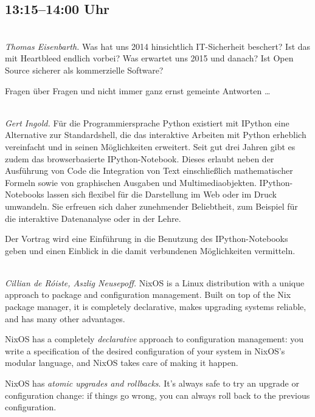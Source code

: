 \documentclass[10pt,a4paper,ngerman]{scrartcl}
\let\origdescription\description
\renewenvironment{description}{
  \setlength{\leftmargini}{0em}
  \origdescription
  \setlength{\itemindent}{0em}
  \setlength{\itemsep}{1.2em}
  \setlength{\labelsep}{\textwidth}
}
{\endlist}
\newcommand{\vorschub}{\mbox{}\\[-0.5em]}
\begin{document}
\begin{multicols}{2}

\section{13:15--14:00 Uhr}
\begin{description}

\item[Quo vadis, IT-Sicherheit? Nichts ist sicher \ldots]\vorschub
\textsl{Thomas Eisenbarth.}
Was hat uns 2014 hinsichtlich IT-Sicherheit beschert? Ist das mit Heartbleed endlich vorbei? Was erwartet uns 2015 und danach? Ist Open Source sicherer als kommerzielle Software?

Fragen über Fragen und nicht immer ganz ernst gemeinte Antworten \ldots



\item[Arbeiten mit dem IPython-Notebook]\vorschub
\textsl{Gert Ingold.}
Für die Programmiersprache Python existiert mit IPython eine Alternative zur Standardshell, die das interaktive Arbeiten mit Python erheblich vereinfacht und in seinen Möglichkeiten erweitert. Seit gut drei Jahren gibt es zudem das browserbasierte IPython-Notebook. Dieses erlaubt neben der Ausführung von Code die Integration von Text einschließlich mathematischer Formeln sowie von graphischen Ausgaben und Multimediaobjekten. IPython-Notebooks lassen sich flexibel für die Darstellung im Web oder im Druck umwandeln. Sie erfreuen sich daher zunehmender Beliebtheit, zum Beispiel für die interaktive Datenanalyse oder in der Lehre.

Der Vortrag wird eine Einführung in die Benutzung des IPython-Notebooks geben und einen Einblick in die damit verbundenen Möglichkeiten vermitteln.


\item[NixOS: The Purely Functional Linux Distribution]\vorschub
\textsl{Cillian de Róiste, Aszlig Neusepoff.}
NixOS is a Linux distribution with a unique approach to package and configuration management. Built on top of the Nix package manager, it is completely declarative, makes upgrading systems reliable, and has many other advantages.

NixOS has a completely \emph{declarative} approach to configuration management: you write a specification of the desired configuration of your system in NixOS’s modular language, and NixOS takes care of making it happen.

NixOS has \emph{atomic upgrades and rollbacks}. It’s always safe to try an upgrade or configuration change: if things go wrong, you can always roll back to the previous configuration.
\end{description}


\end{multicols}
\end{document}
